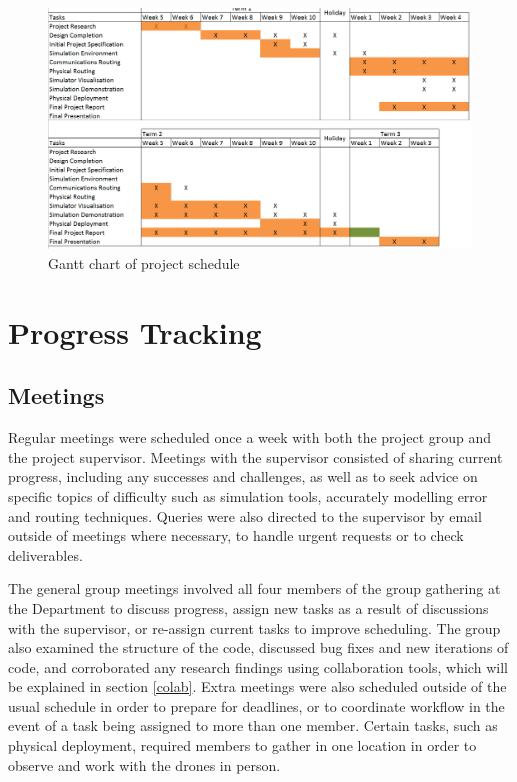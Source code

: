 \begin{figure}
\centering	
\includegraphics[scale=0.75,angle=90]{img/progantt.png}
\caption{Gantt chart of project schedule}
\label{gantt}
\end{figure}

\section{Progress Tracking}

\subsection{Meetings}
Regular meetings were scheduled once a week with both the project group and the project supervisor. Meetings with the supervisor consisted of sharing current progress, including any successes and challenges, as well as to seek advice on specific topics of difficulty such as simulation tools, accurately modelling error and routing techniques. Queries were also directed to the supervisor by email outside of meetings where necessary, to handle urgent requests or to check deliverables. 

The general group meetings involved all four members of the group gathering at the Department to discuss progress, assign new tasks as a result of discussions with the supervisor, or re-assign current tasks to improve scheduling. The group also examined the structure of the code, discussed bug fixes and new iterations of code, and corroborated any research findings using collaboration tools, which will be explained in section \ref{colab}. Extra meetings were also scheduled outside of the usual schedule in order to prepare for deadlines, or to coordinate workflow in the event of a task being assigned to more than one member. Certain tasks, such as physical deployment, required members to gather in one location in order to observe and work with the drones in person.

